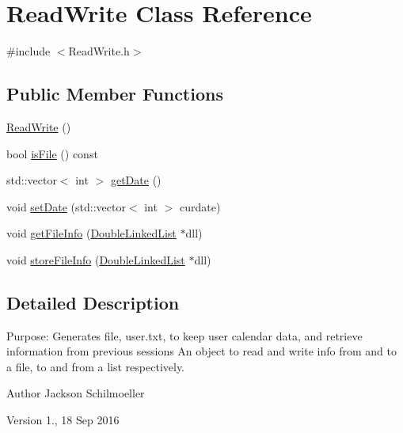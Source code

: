 \hypertarget{classReadWrite}{\section{Read\-Write Class Reference}
\label{classReadWrite}
}


{\ttfamily \#include $<$Read\-Write.\-h$>$}

\subsection*{Public Member Functions}
\begin{DoxyCompactItemize}
\item 
\hyperlink{classReadWrite_a11c22591e481ff4fc111e485ab2955c2}{Read\-Write} ()
\item 
bool \hyperlink{classReadWrite_a82950d962ae4e05f04772b82b6690670}{is\-File} () const 
\item 
std\-::vector$<$ int $>$ \hyperlink{classReadWrite_af7557737b9043d9e605473c7e6984046}{get\-Date} ()
\item 
void \hyperlink{classReadWrite_a22a0b16f5004c059980424203c84978a}{set\-Date} (std\-::vector$<$ int $>$ curdate)
\item 
void \hyperlink{classReadWrite_a778d106489a4f41730d902d338ec3937}{get\-File\-Info} (\hyperlink{classDoubleLinkedList}{Double\-Linked\-List} $\ast$dll)
\item 
void \hyperlink{classReadWrite_a323d8e4f3bf72f0ef4726b3c08f0f4c3}{store\-File\-Info} (\hyperlink{classDoubleLinkedList}{Double\-Linked\-List} $\ast$dll)
\end{DoxyCompactItemize}


\subsection{Detailed Description}
Purpose\-: Generates file, user.\-txt, to keep user calendar data, and retrieve information from previous sessions An object to read and write info from and to a file, to and from a list respectively. \begin{DoxyAuthor}{Author}
Jackson Schilmoeller 
\end{DoxyAuthor}
\begin{DoxyVersion}{Version}
1., 18 Sep 2016 
\end{DoxyVersion}


